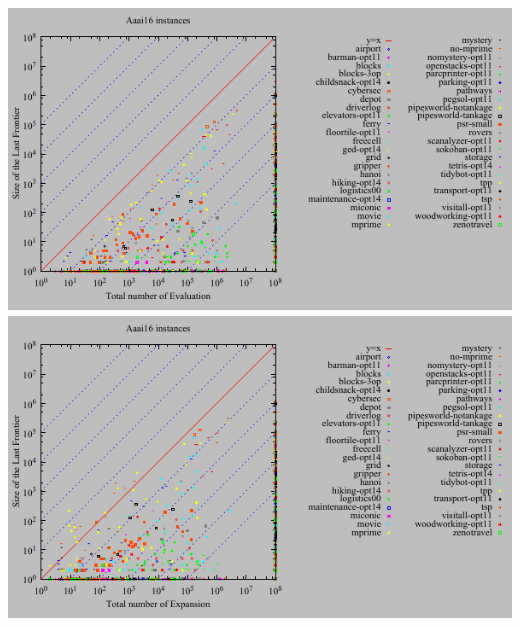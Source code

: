\includegraphics{tables/aaai16-front-vs-evaluated.pdf}
\linebreak
\includegraphics{tables/aaai16-front-vs-expanded.pdf}
\linebreak

